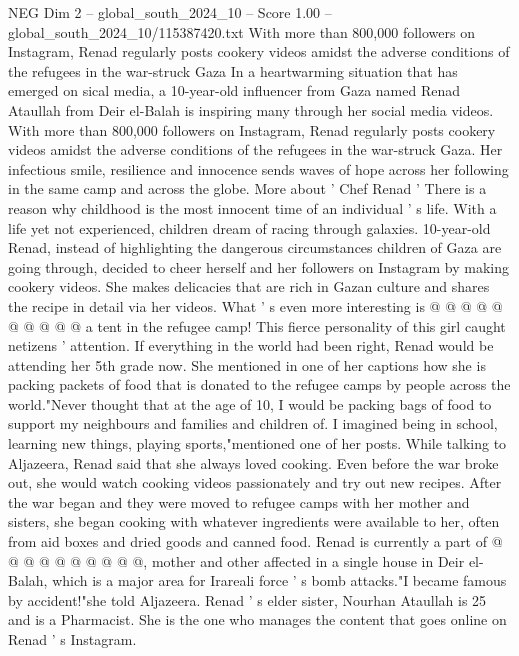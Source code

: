 \begin{textsample}{NEG Dim 2 – global\_south\_2024\_10 – Score 1.00 – global\_south\_2024\_10/115387420.txt}  \label{ex:f2_neg_420}
With more than 800,000 followers on Instagram, Renad regularly posts cookery videos amidst the adverse conditions of the refugees in the war-struck Gaza In a heartwarming situation that has emerged on sical media, a 10-year-old influencer from Gaza named Renad Ataullah from Deir el-Balah is inspiring many through her social media videos.
With more than 800,000 followers on Instagram, Renad regularly posts cookery videos amidst the adverse conditions of the refugees in the war-struck Gaza.
Her infectious smile, resilience and innocence sends waves of hope across her following in the same camp and across the globe.
More about ' Chef Renad ' There is a reason why childhood is the most innocent time of an individual ' s life.
With a life yet not experienced, children dream of racing through galaxies. 10-year-old Renad, instead of highlighting the dangerous circumstances children of Gaza are going through, decided to cheer herself and her followers on Instagram by making cookery videos.
She makes delicacies that are rich in Gazan culture and shares the recipe in detail via her videos.
What ' s even more interesting is @ @ @ @ @ @ @ @ @ @ a tent in the refugee camp!
This fierce personality of this girl caught netizens ' attention.
If everything in the world had been right, Renad would be attending her 5th grade now.
She mentioned in one of her captions how she is packing packets of food that is donated to the refugee camps by people across the world."Never thought that at the age of 10, I would be packing bags of food to support my neighbours and families and children of.
I imagined being in school, learning new things, playing sports,"mentioned one of her posts.
While talking to Aljazeera, Renad said that she always loved cooking.
Even before the war broke out, she would watch cooking videos passionately and try out new recipes.
After the war began and they were moved to refugee camps with her mother and sisters, she began cooking with whatever ingredients were available to her, often from aid boxes and dried goods and canned food.
Renad is currently a part of @ @ @ @ @ @ @ @ @ @, mother and other affected in a single house in Deir el-Balah, which is a major area for Irareali force ' s bomb attacks."I became famous by accident!"she told Aljazeera.
Renad ' s elder sister, Nourhan Ataullah is 25 and is a Pharmacist.
She is the one who manages the content that goes online on Renad ' s Instagram.

\end{textsample}
